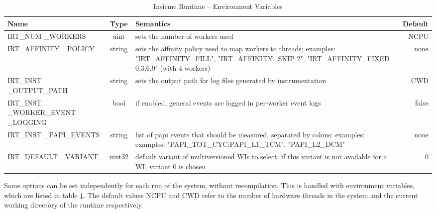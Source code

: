 \begin{table}[htbp] \small
	\centering
    \begin{tabular}{|p{3cm}|c|p{7cm}|r|}
        \hline
        Name                              & Type   & Semantics                                                                                                       & Default       \\ \hline \hline
        IRT\_NUM \_WORKERS                 & uint   & sets the number of workers used                                                                                 & NCPU                \\ \hline
        IRT\_AFFINITY \_POLICY             & string & sets the affinity policy used to map workers to threads; examples: "IRT\_AFFINITY\_FILL", "IRT\_AFFINITY\_SKIP 2", "IRT\_AFFINITY\_FIXED 0,3,6,9" (with 4 workers)                                                         & none \\ \hline
        IRT\_INST \_OUTPUT\_PATH           & string & sets the output path for log files generated by instrumentation                                                 & CWD                 \\ \hline
        IRT\_INST \_WORKER\_EVENT \_LOGGING & bool   & if enabled, general events are logged in per-worker event logs                                                  & false               \\ \hline
        IRT\_INST \_PAPI\_EVENTS           & string & list of papi events that should be measured, separated by colons; examples: examples: "PAPI\_TOT\_CYC:PAPI\_L1\_TCM", "PAPI\_L2\_DCM"                                                & none                \\ \hline
        IRT\_DEFAULT \_VARIANT               & uint32 & default variant of multiversioned WIs to select; if this variant is not available for a WI, variant 0 is chosen & 0                   \\ \hline
    \end{tabular}
	\caption{Insieme Runtime -- Environment Variables}
	\label{tab:runtime:options:environment}
\end{table} 
Some options can be set independently for each run of the system, without recompilation. This is handled with environment variables, which are listed in table \ref{tab:runtime:options:environment}. The default values NCPU and CWD refer to the number of hardware threads in the system and the current working directory of the runtime respectively.

